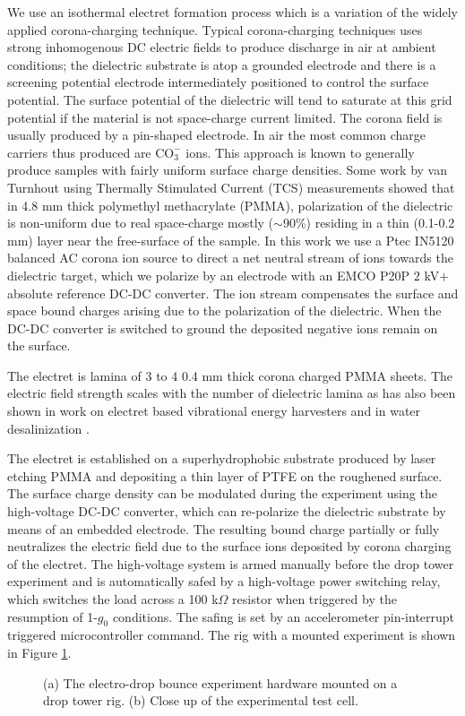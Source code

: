 \documentclass[12pt,a4paper,oneside]{book}
\begin{document}
We use an isothermal electret formation process which is a variation of the widely applied corona-charging technique. Typical corona-charging techniques uses strong inhomogenous DC electric fields to produce discharge in air at ambient conditions; the dielectric substrate is atop a grounded electrode and there is a screening potential electrode intermediately positioned to control the surface potential. The surface potential of the dielectric will tend to saturate at this grid potential if the material is not space-charge current limited. The corona field is usually produced by a pin-shaped electrode. In air the most common charge carriers thus produced are $\mbox{CO}_3^-$ ions. This approach is known to generally produce samples with fairly uniform surface charge densities. Some work by van Turnhout \cite{van_turnhout_thermally_1975} using Thermally Stimulated Current (TCS) measurements showed that in 4.8 mm thick polymethyl methacrylate (PMMA), polarization of the dielectric is non-uniform due to real space-charge mostly ($\sim$90\%) residing in a thin (0.1-0.2 mm) layer near the free-surface of the sample. In this work we use a Ptec IN5120 balanced AC corona ion source to direct a net neutral stream of ions towards the dielectric target, which we polarize by an electrode with an EMCO P20P $2$ kV$+$ absolute reference DC-DC converter. The ion stream compensates the surface and space bound charges arising due to the polarization of the dielectric. When the DC-DC converter is switched to ground the deposited negative ions remain on the surface. 

The electret is lamina of 3 to 4 0.4 mm thick corona charged PMMA sheets. The electric field strength scales with the number of dielectric lamina as has also been shown in work on electret based vibrational energy harvesters \cite{wada_stacking_2012} and in water desalinization \cite{ni_desalination_2005}. 

The electret is established on a superhydrophobic substrate produced by laser etching PMMA and depositing a thin layer of PTFE on the roughened surface. The surface charge density can be modulated during the experiment using the high-voltage DC-DC converter, which can re-polarize the dielectric substrate by means of an embedded electrode. The resulting bound charge partially or fully neutralizes the electric field due to the surface ions deposited by corona charging of the electret. The high-voltage system is armed manually before the drop tower experiment and is automatically safed by a high-voltage power switching relay, which switches the load across a 100 k$\Omega$ resistor when triggered by the resumption of 1-$g_0$ conditions. The safing is set by an accelerometer pin-interrupt triggered microcontroller command. The rig with a mounted experiment is shown in Figure \ref{fig:rig}. 
\begin{figure}
    \centering
    \def\svgwidth{\columnwidth}
        \subfloat[]{%
}

    \caption{(a) The electro-drop bounce experiment hardware mounted on a drop tower rig. (b) Close up of the experimental test cell.\label{fig:rig}}
\end{figure}
\end{document}

